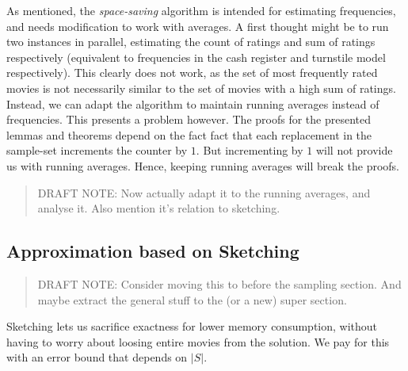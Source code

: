As mentioned, the \textit{space-saving} algorithm is intended for
estimating frequencies, and needs modification to work with averages. A first
thought might be to run two instances in parallel, estimating the count of
ratings and sum of ratings respectively (equivalent to frequencies in the cash
register and turnstile model respectively). This clearly does not work, as the
set of most frequently rated movies is not necessarily similar to the set of
movies with a high sum of ratings. Instead, we can adapt the algorithm to
maintain running averages instead of frequencies. This presents a problem
however. The proofs for the presented lemmas and theorems depend on the fact
fact that each replacement in the sample-set increments the counter by $1$. But
incrementing by $1$ will not provide us with running averages. Hence, keeping
running averages will break the proofs. 

\begin{quote}
	DRAFT NOTE: Now actually adapt it
	to the running averages, and analyse it.
	Also mention it's relation to sketching.
\end{quote}

\subsection{Approximation based on Sketching}

\begin{quote}
	DRAFT NOTE: Consider moving this to before the sampling section.
	And maybe extract the general stuff to the (or a new) super section.
\end{quote}
Sketching lets us sacrifice exactness for lower memory consumption, without
having to worry about loosing entire movies from the solution. We pay for this
with an error bound that depends on $|S|$.

